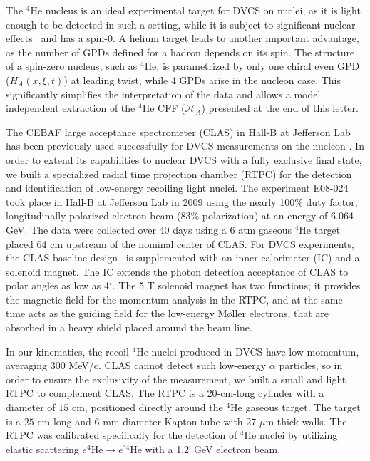 \documentclass[twocolumn,nofootinbib,showpacs,prl,superscriptaddress,secnumarabic,amssymb,nobibnotes,aps,floatfix]{revtex4}
\begin{document}
The $^4$He nucleus is an ideal experimental target for DVCS on nuclei, as it 
is light enough to be detected in such a setting, while it is subject to 
significant nuclear effects~\cite{JSeely} and has a spin-0. A helium target leads to another 
important advantage, as the number of GPDs defined for a hadron depends on its 
spin. The structure of a spin-zero nucleus, such as $^4$He, is parametrized by 
only one chiral even GPD ($H_{A}(x,\xi,t)$) at leading twist, while 4 GPDs 
arise in the nucleon case. This significantly simplifies the interpretation of 
the data and allows a model independent extraction of the $^4$He CFF 
($\mathcal{H}_{A}$) presented at the end of this letter. 

The CEBAF large acceptance spectrometer (CLAS) in Hall-B at Jefferson Lab has been
previously used successfully for DVCS measurements on the nucleon
\cite{Girod:2007aa,Gavalian:2009,Seder:2015,Pisano:2015,Jo:2015ema}.  In order
to extend its capabilities to nuclear DVCS with a fully exclusive final state,
we built a specialized radial time projection chamber (RTPC) for the detection
and identification of low-energy recoiling light nuclei. 
The experiment E08-024 took place in Hall-B at Jefferson Lab in 2009 using the 
nearly 100\% duty factor, longitudinally polarized electron beam (83$\%$ 
polarization) at an energy of 6.064 GeV. The data were collected over 40 days 
using a 6 atm gaseous $^4$He target placed 64 cm upstream of the nominal center 
of CLAS. For DVCS experiments, the CLAS 
baseline design~\cite{Mecking:2003zu} 
is supplemented with an inner calorimeter (IC) and a solenoid magnet. The IC 
extends the photon detection acceptance of CLAS to polar angles as low as 
4$^{\circ}$. The 5 T solenoid magnet has two functions; it provides the magnetic 
field for the momentum analysis in the RTPC, and at the same time acts as 
the guiding field for the low-energy M\o{}ller electrons, that are absorbed in a  
heavy shield placed around the beam line. 

In our kinematics, the recoil $^4$He nuclei produced in DVCS have low momentum,
averaging 300 MeV/c. CLAS cannot detect such low-energy $\alpha$ 
particles, so in order to ensure the exclusivity of the measurement, we built a 
small and light RTPC to complement CLAS. The RTPC is a $20$-cm-long cylinder 
with a diameter of $15$ cm, positioned directly around the $^4$He gaseous 
target. The target is a $25$-cm-long and $6$-mm-diameter Kapton tube with 
$27$-$\mu$m-thick walls. The RTPC was calibrated specifically for the detection of 
$^4$He nuclei by utilizing elastic scattering $e^4$He$\to e^\prime$$^4$He with
a 1.2~GeV electron beam.
\end{document}
